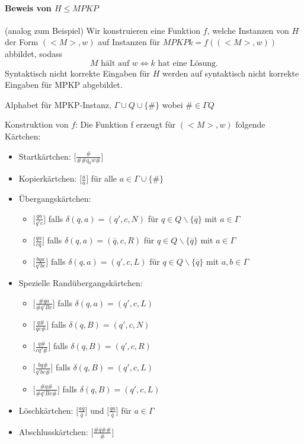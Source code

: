 \paragraph*{Beweis von $H \leq MPKP$} (analog zum Beispiel) Wir konstruieren eine Funktion $f$, welche Instanzen von $H$ der Form $(<M>,w)$ auf Instanzen für $MPKP k=f((<M>,w))$ abbildet, sodass $$ M \text{ hält auf } w \Leftrightarrow k \text{ hat eine Lösung.}$$ Syntaktisch nicht korrekte Eingaben für $H$ werden auf syntaktisch nicht korrekte Eingaben für MPKP abgebildet.

\para{} Alphabet für MPKP-Instanz, $\Gamma \cup Q \cup \{\#\}$ wobei $\#\in\Gamma Q$

\para{} Konstruktion von $f$: Die Funktion f erzeugt für $(<M>,w)$ folgende Kärtchen:

\begin{itemize}
	\item[] Startkärtchen: $\Big[ \frac{\#}{\#\#q_0 w\#} \Big]$
	\item[] Kopierkärtchen: $\Big[ \frac{a}{a} \Big]$ für alle $a \in \Gamma \cup \{\#\}$
	\item[] Übergangskärtchen: 
	\begin{itemize}
		\item[] $\Big[ \frac{qa}{q'c} \Big]$ falls $\delta(q,a)=(q',c,N)$ für $q \in Q\backslash\{\overline{q}\}$ mit $a \in \Gamma$
		\item[] $\Big[ \frac{qa}{c\overline{q}} \Big]$ falls $\delta(q,a)=(\overline{q},c,R)$ für $q \in Q\backslash\{\overline{q}\}$ mit $a \in \Gamma$
		\item[] $\Big[ \frac{bqa}{q'bc} \Big]$ falls $\delta(q,a)=(q',c,L)$ für $q \in Q\backslash\{\overline{q}\}$ mit $a,b \in \Gamma$
	\end{itemize}
	\item[] Spezielle Randübergangskärtchen:
	\begin{itemize}
		\item[] $\Big[ \frac{\#qa}{\#q'Bc} \Big]$ falls $\delta(q,a)=(q',c,L)$
		\item[] $\Big[ \frac{q\#}{\overline{q}c\#} \Big]$ falls $\delta(q,B)=(q',c,N)$
		\item[] $\Big[ \frac{q\#}{cq'\#} \Big]$ falls $\delta(q,B)=(q',c,R)$
		\item[] $\Big[ \frac{bq\#}{q'bc\#} \Big]$ falls $\delta(q,B)=(q',c,L)$
		\item[] $\Big[ \frac{\#q\#}{\#q'Bc\#} \Big]$ falls $\delta(q,B)=(q',c,L)$
	\end{itemize}
	\item[] Löschkärtchen: $\Big[ \frac{a\overline{q}}{\overline{q}} \Big]$ und $\Big[ \frac{\overline{q}a}{\overline{q}} \Big]$ für $a \in \Gamma$
	\item[] Abschlusskärtchen: $\Big[ \frac{\#\overline{q}\#\#}{\#} \Big]$
\end{itemize}


